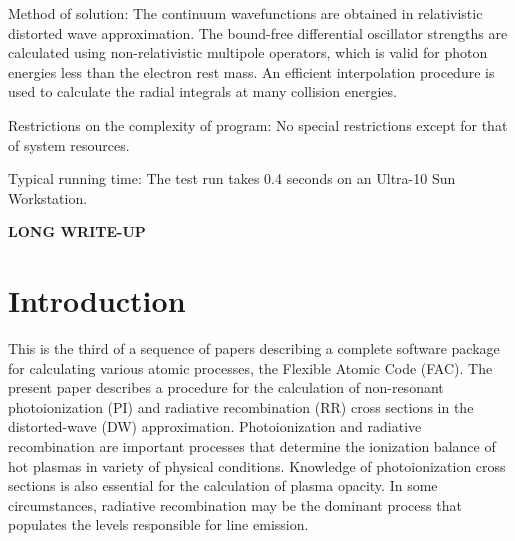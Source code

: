 \documentclass{elsart}
\begin{document}
Method of solution: The continuum wavefunctions are obtained in relativistic
distorted wave approximation. The bound-free differential oscillator strengths
are calculated using non-relativistic multipole operators, which is valid for
photon energies less than the electron rest mass. An efficient interpolation
procedure is used to calculate the radial integrals at many collision
energies. 

Restrictions on the complexity of program: No special restrictions except for
that of system resources. 

Typical running time: The test run takes 0.4 seconds on an Ultra-10 Sun
Workstation. 

\textbf{\large LONG WRITE-UP}

\section{Introduction}
This is the third of a sequence of papers describing a complete software
package for calculating various atomic processes, the Flexible Atomic Code
(FAC). The present paper describes a procedure for the calculation of
non-resonant photoionization (PI) and radiative recombination (RR) cross
sections in the distorted-wave (DW) approximation. Photoionization 
and radiative recombination are important processes that determine the
ionization balance of hot plasmas in variety of physical conditions. Knowledge
of photoionization cross sections is also essential for the calculation of
plasma opacity. In some circumstances, radiative recombination may be the
dominant process that populates the levels responsible for line emission. 
\end{document}
